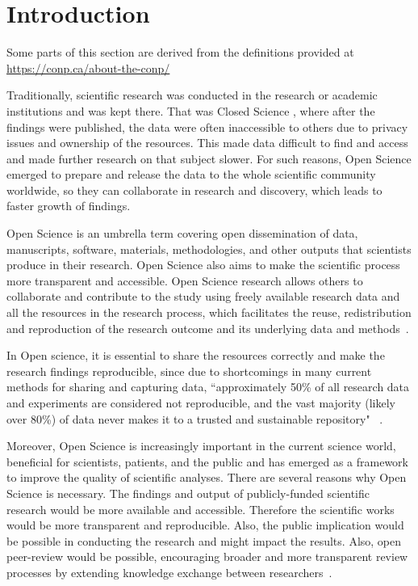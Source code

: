 \chapter{Introduction}

\label{introduction}

Some parts of this section are derived from the definitions provided at \url{https://conp.ca/about-the-conp/} 

Traditionally, scientific research was conducted in the research or academic institutions and was kept there. That was Closed Science , where after the findings were published, the data were often inaccessible to others due to privacy issues and ownership of the resources. This made data difficult to find and access and made further research on that subject slower. For such reasons, Open Science emerged to prepare and release the data to the whole scientific community worldwide, so they can collaborate in research and discovery, which leads to faster growth of findings.

Open Science is an umbrella term covering open dissemination of data, manuscripts, software, materials, methodologies, and other outputs that scientists produce in their research. Open Science also aims to make the scientific process more transparent and accessible. Open Science research allows others to collaborate and contribute to the study using freely available research data and all the resources in the research process, which facilitates the reuse, redistribution and reproduction of the research outcome and its underlying data and methods~\cite{bartling2014opening}. 

In Open science, it is essential to share the resources correctly and make the research findings reproducible, since due to shortcomings in many current methods for sharing and capturing data, ``approximately 50\% of all research data and experiments are considered not reproducible, and the vast majority (likely over 80\%) of data never makes it to a trusted and sustainable repository" ~\cite{ayris2016realising}.

Moreover, Open Science is increasingly important in the current science world, beneficial for scientists, patients, and the public and has emerged as a framework to improve the quality of scientific analyses. There are several reasons why Open Science is necessary. The findings and output of publicly-funded scientific research would be more available and accessible. Therefore the scientific works would be more transparent and reproducible. Also, the public implication would be possible in conducting the research and might impact the results. Also, open peer-review would be possible, encouraging broader and more transparent review processes by extending knowledge exchange between researchers~\cite{wolfram2020open,ross2019guidelines}. 


